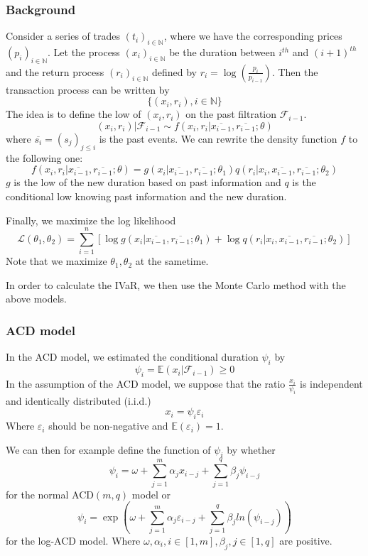 \documentclass[12pt, a4paper]{article}
\begin{document}
\subsubsection{Background}
Consider a series of trades $(t_i)_{i\in \mathbb{N}}$, where we have the corresponding prices $(p_i)_{i\in \mathbb{N}}$.
Let the process $(x_i)_{i\in\mathbb{N}}$ be the duration between $i^{th}$ and $(i+1)^{th}$
and the return process $(r_i)_{i\in\mathbb{N}}$ defined by $r_i = \log (\frac{p_i}{p_{i-1}})$.
Then the transaction process can be written by 
$$\{ (x_i, r_i), i\in \mathbb{N}\}$$
The idea is to define the low of $(x_i, r_i)$ on the past filtration $\mathcal{F}_{i-1}$.
$$(x_i, r_i) | \mathcal{F}_{i-1} \sim f\left( x_i, r_i | \overline{x_{i-1}}, \overline{r_{i-1}}; \theta \right)$$
where $\overline{s_{i}} = (s_j)_{j \le i}$ is the past events.
We can rewrite the density function $f$ to the following one:
$$f\left( x_i, r_i|\overline{x_{i-1}}, \overline{r_{i-1}}; \theta \right) = g\left( x_i|\overline{x_{i-1}}, \overline{r_{i-1}}; \theta_1 \right)q\left( r_i|x_i, \overline{x_{i-1}}, \overline{r_{i-1}}; \theta_2 \right)$$
$g$ is the low of the new duration based on past information and $q$ is the conditional low knowing past information and the new duration. 

Finally, we maximize the log likelihood
\begin{equation}
\mathcal{L}(\theta_1, \theta_2) = \sum_{i=1}^n \left[ \log g(x_i|\overline{x_{i-1}}, \overline{r_{i-1}}; \theta_1) + \log q(r_i|x_i, \overline{x_{i-1}}, \overline{r_{i-1}}; \theta_2) \right]
\label{max_likelihood}
\end{equation}
Note that we maximize $\theta_1, \theta_2$ at the sametime.

In order to calculate the IVaR, we then use the Monte Carlo method with the above models.
\subsubsection{ACD model}
In the ACD model, we estimated the conditional duration $\psi_i$ by
$$\psi_i = \mathbb{E}(x_i|\mathcal{F}_{i-1}) \ge 0$$
In the assumption of the ACD model, we suppose that the ratio $\frac{x_i}{\psi_i}$ is independent and identically distributed (i.i.d.)
$$x_i = \psi_i \varepsilon_i$$
Where $\varepsilon_i$ should be non-negative and $\mathbb{E}(\varepsilon_i) = 1$. 

We can then for example define the function of $\psi_i$ by whether
$$\psi_i = \omega + \sum_{j=1}^m \alpha_j x_{i-j} + \sum_{j=1}^q \beta_j \psi_{i-j}$$
for the normal ACD$(m, q)$ model or
\begin{equation}
\psi_i = \exp\left( \omega + \sum_{j=1}^m \alpha_j \varepsilon_{i-j} + \sum_{j=1}^q \beta_j ln(\psi_{i-j})\right)
\end{equation}
for the log-ACD model. Where $\omega, \alpha_i, i\in{[1, m]}, \beta_j, j\in{[1, q]}$ are positive.
\end{document}
